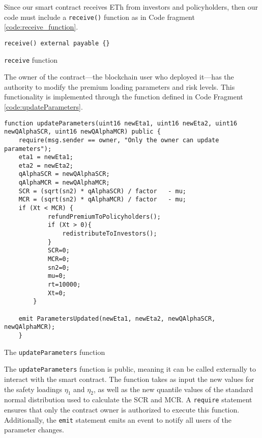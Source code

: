 \documentclass[10pt]{article}
\begin{document}
Since our smart contract receives ETh from investors and policyholders, then our code must include a \texttt{receive()} function as in Code fragment \ref{code:receive_function}.

\begin{codefragment}[!ht]
\begin{lstlisting}[language=Solidity]
    receive() external payable {}
\end{lstlisting}
    \caption{\texttt{receive} function}
    \label{code:receive_function}
\end{codefragment}

The owner of the contract—the blockchain user who deployed it—has the authority to modify the premium loading parameters and risk levels. This functionality is implemented through the function defined in Code Fragment \ref{code:updateParameters}.

\begin{codefragment}[!h]
\begin{lstlisting}[language=Solidity]
   function updateParameters(uint16 newEta1, uint16 newEta2, uint16 newQAlphaSCR, uint16 newQAlphaMCR) public {
    require(msg.sender == owner, "Only the owner can update parameters");
    eta1 = newEta1;
    eta2 = newEta2;
    qAlphaSCR = newQAlphaSCR;
    qAlphaMCR = newQAlphaMCR;
    SCR = (sqrt(sn2) * qAlphaSCR) / factor   - mu;
    MCR = (sqrt(sn2) * qAlphaMCR) / factor   - mu;
    if (Xt < MCR) {
            refundPremiumToPolicyholders();
            if (Xt > 0){
                redistributeToInvestors();
            }
            SCR=0;
            MCR=0;
            sn2=0;
            mu=0;
            rt=10000;
            Xt=0;
        }

    emit ParametersUpdated(newEta1, newEta2, newQAlphaSCR, newQAlphaMCR);
    }
\end{lstlisting}
    \caption{The \texttt{updateParameters} function}
    \label{code:updateParameters}
\end{codefragment}

The \texttt{updateParameters} function is public, meaning it can be called externally to interact with the smart contract. The function takes as input the new values for the safety loadings \(\eta_1\) and \(\eta_2\), as well as the new quantile values of the standard normal distribution used to calculate the SCR and MCR. A \texttt{require} statement ensures that only the contract owner is authorized to execute this function. Additionally, the \texttt{emit} statement emits an event to notify all users of the parameter changes.
\end{document}
